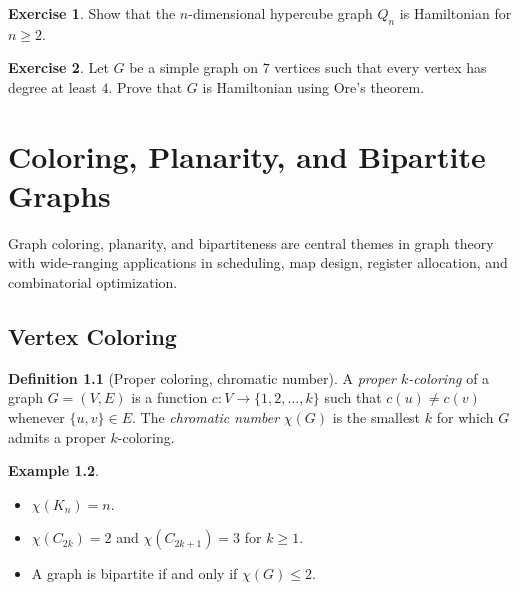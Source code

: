 \documentclass[12pt,a4paper,openany]{book}
\theoremstyle{definition}
\newtheorem{definition}{Definition}[chapter]
\newtheorem{example}[definition]{Example}
\newtheorem{exercise}{Exercise}[chapter]
\theoremstyle{plain}
\theoremstyle{remark}
\begin{document}
\begin{exercise}
\label{exo:hamilton-cube}
Show that the $n$-dimensional hypercube graph $Q_n$ is Hamiltonian for
$n\ge 2$.
\end{exercise}

\begin{exercise}
\label{exo:ore-application}
Let $G$ be a simple graph on $7$ vertices such that every vertex has
degree at least $4$.  Prove that $G$ is Hamiltonian using Ore's theorem.
\end{exercise}



\chapter{Coloring, Planarity, and Bipartite Graphs}
\label{ch:coloring-planarity}

Graph coloring, planarity, and bipartiteness are central themes in
graph theory with wide-ranging applications in scheduling, map design,
register allocation, and combinatorial optimization.

\section{Vertex Coloring}
\label{sec:vertex-coloring}

\begin{definition}[Proper coloring, chromatic number]
\label{def:proper-coloring}
A \emph{proper $k$-coloring} of a graph $G=(V,E)$ is a function
$c\colon V\to\{1,2,\dots,k\}$ such that $c(u)\ne c(v)$ whenever
$\{u,v\}\in E$.  The \emph{chromatic number} $\chi(G)$ is the smallest
$k$ for which $G$ admits a proper $k$-coloring.
\end{definition}

\begin{example}
\label{ex:chi-basic}
\begin{itemize}
  \item $\chi(K_n)=n$.
  \item $\chi(C_{2k})=2$ and $\chi(C_{2k+1})=3$ for $k\ge 1$.
  \item A graph is bipartite if and only if $\chi(G)\le 2$.
\end{itemize}
\end{example}
\end{document}
